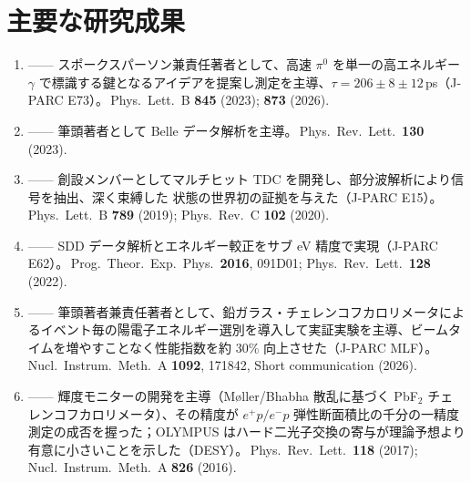 \documentclass[a4paper,11pt,fontset=none]{ctexart}
\begin{document}
\section{主要な研究成果}
\begin{enumerate}
  \item {} —— スポークスパーソン兼責任著者として、高速 $\pi^0$ を単一の高エネルギー $\gamma$ で標識する鍵となるアイデアを提案し測定を主導、$\tau=206\pm8\pm12$\,ps（J-PARC E73）。\,{\small Phys.\ Lett.\ B \textbf{845} (2023); \textbf{873} (2026).}
  \item {} —— 筆頭著者として Belle データ解析を主導。\,{\small Phys.\ Rev.\ Lett.\ \textbf{130} (2023).}
  \item {} —— 創設メンバーとしてマルチヒット TDC を開発し、部分波解析により信号を抽出、深く束縛した \Kmpp 状態の世界初の証拠を与えた（J-PARC E15）。\,{\small Phys.\ Lett.\ B \textbf{789} (2019); Phys.\ Rev.\ C \textbf{102} (2020).}
  \item {} —— SDD データ解析とエネルギー較正をサブ eV 精度で実現（J-PARC E62）。\,{\small Prog.\ Theor.\ Exp.\ Phys.\ \textbf{2016}, 091D01; Phys.\ Rev.\ Lett.\ \textbf{128} (2022).}
  \item {} —— 筆頭著者兼責任著者として、鉛ガラス・チェレンコフカロリメータによるイベント毎の陽電子エネルギー選別を導入して実証実験を主導、ビームタイムを増やすことなく性能指数を約 30\% 向上させた（J-PARC MLF）。\,{\small Nucl.\ Instrum.\ Meth.\ A \textbf{1092}, 171842, Short communication (2026).}
  \item {} —— 輝度モニターの開発を主導（M{\o}ller/Bhabha 散乱に基づく PbF$_2$ チェレンコフカロリメータ）、その精度が $e^+p/e^-p$ 弾性断面積比の千分の一精度測定の成否を握った；OLYMPUS はハード二光子交換の寄与が理論予想より有意に小さいことを示した（DESY）。\,{\small Phys.\ Rev.\ Lett.\ \textbf{118} (2017); Nucl.\ Instrum.\ Meth.\ A \textbf{826} (2016).}
\end{enumerate}
\end{document}

